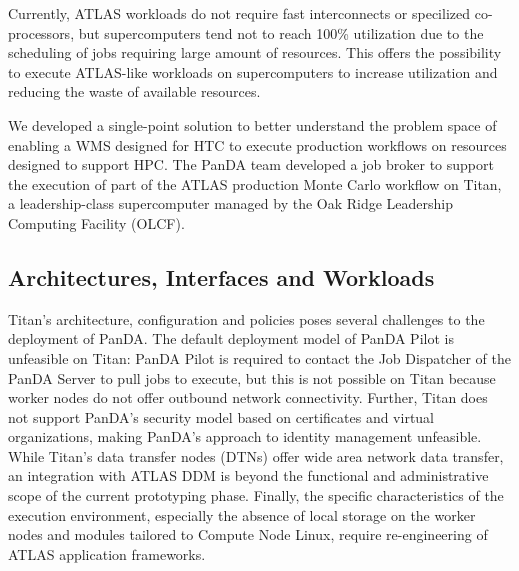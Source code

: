 Currently, ATLAS workloads do not require fast interconnects or specilized
co-processors, but supercomputers tend not to reach 100\% utilization due to
the scheduling of jobs requiring large amount of resources. This offers the
possibility to execute ATLAS-like workloads on supercomputers to increase
utilization and reducing the waste of available resources.

We developed a single-point solution to better understand the problem space
of enabling a WMS designed for HTC to execute production workflows on
resources designed to support HPC\@. The PanDA team developed a job broker to
support the execution of part of the ATLAS production Monte Carlo workflow on
Titan, a leadership-class supercomputer managed by the Oak Ridge Leadership
Computing Facility (OLCF).

\subsection{Architectures, Interfaces and Workloads}
\label{ssec:panda-titan}

%

Titan's architecture, configuration and policies poses several challenges to
the deployment of PanDA\@. The default deployment model of PanDA Pilot is
unfeasible on Titan: PanDA Pilot is required to contact the Job Dispatcher of
the PanDA Server to pull jobs to execute, but this is not possible on Titan
because worker nodes do not offer outbound network connectivity. Further,
Titan does not support PanDA's security model based on certificates and
virtual organizations, making PanDA's approach to identity management 
unfeasible. While Titan's data transfer nodes (DTNs) offer wide area network
data transfer, an integration with ATLAS DDM is beyond the functional and
administrative scope of the current prototyping phase. Finally, the specific
characteristics of the execution environment, especially the absence of local
storage on the worker nodes and modules tailored to Compute Node Linux,
require re-engineering of ATLAS application frameworks.

